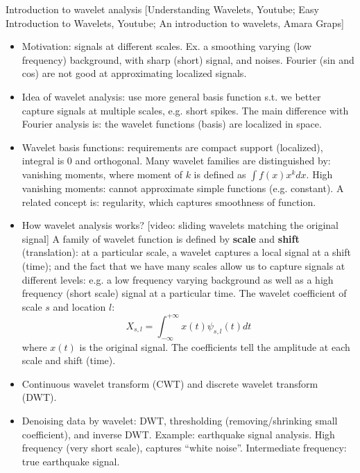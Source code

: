 \documentclass{report}
\begin{document}
Introduction to wavelet analysis [Understanding Wavelets, Youtube; Easy Introduction to Wavelets, Youtube; An introduction to wavelets, Amara Graps]
\begin{itemize}
	\item Motivation: signals at different scales. Ex. a smoothing varying (low frequency) background, with sharp (short) signal, and noises. Fourier (sin and cos) are not good at approximating localized signals.
	
	\item Idea of wavelet analysis: use more general basis function s.t. we better capture signals at multiple scales, e.g. short spikes. The main difference with Fourier analysis is: the wavelet functions (basis) are localized in space. 
	
	\item Wavelet basis functions: requirements are compact support (localized), integral is 0 and orthogonal. Many wavelet families are distinguished by: vanishing moments, where moment of $k$ is defined as $\int f(x) x^k dx$. High vanishing moments: cannot approximate simple functions (e.g. constant). A related concept is: regularity, which captures smoothness of function. 
		
	\item How wavelet analysis works? [video: sliding wavelets matching the original signal] A family of wavelet function is defined by \textbf{scale} and \textbf{shift} (translation): at a particular scale, a wavelet captures a local signal at a shift (time); and the fact that we have many scales allow us to capture signals at different levels: e.g. a low frequency varying background as well as a high frequency (short scale) signal at a particular time. The wavelet coefficient of scale $s$ and location $l$: 
	\begin{equation}
	X_{s,l} = \int_{-\infty}^{+\infty} x(t) \psi_{s,l}(t) dt
	\end{equation}
	where $x(t)$ is the original signal. The coefficients tell the amplitude at each scale and shift (time). 
	
	\item Continuous wavelet transform (CWT) and discrete wavelet transform (DWT).  
	
	\item Denoising data by wavelet: DWT, thresholding (removing/shrinking small coefficient), and inverse DWT. Example: earthquake signal analysis. High frequency (very short scale), captures ``white noise''. Intermediate frequency: true earthquake signal. 
		

\end{itemize}
\end{document}
